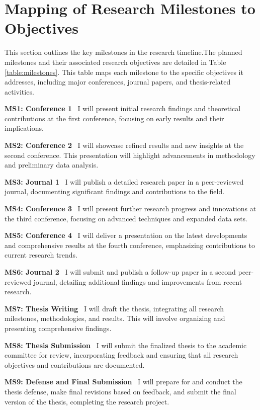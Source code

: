 \section{Mapping of Research Milestones to Objectives}
This section outlines the key milestones in the research timeline.The planned milestones and their associated research objectives are detailed in Table \ref{table:milestones}. This table maps each milestone to the specific objectives it addresses, including major conferences, journal papers, and thesis-related activities.

\noindent \textbf{MS1: Conference 1} \
I will present initial research findings and theoretical contributions at the first conference, focusing on early results and their implications.

\noindent \textbf{MS2: Conference 2} \
I will showcase refined results and new insights at the second conference. This presentation will highlight advancements in methodology and preliminary data analysis.

\noindent \textbf{MS3: Journal 1} \
I will publish a detailed research paper in a peer-reviewed journal, documenting significant findings and contributions to the field.

\noindent \textbf{MS4: Conference 3} \
I will present further research progress and innovations at the third conference, focusing on advanced techniques and expanded data sets.

\noindent \textbf{MS5: Conference 4} \
I will deliver a presentation on the latest developments and comprehensive results at the fourth conference, emphasizing contributions to current research trends.

\noindent \textbf{MS6: Journal 2 } \
I will submit and publish a follow-up paper in a second peer-reviewed journal, detailing additional findings and improvements from recent research.

\noindent \textbf{MS7: Thesis Writing } \
I will draft the thesis, integrating all research milestones, methodologies, and results. This will involve organizing and presenting comprehensive findings.

\noindent \textbf{MS8: Thesis Submission} \
I will submit the finalized thesis to the academic committee for review, incorporating feedback and ensuring that all research objectives and contributions are documented.

\noindent \textbf{MS9: Defense and Final Submission} \
I will prepare for and conduct the thesis defense, make final revisions based on feedback, and submit the final version of the thesis, completing the research project.

